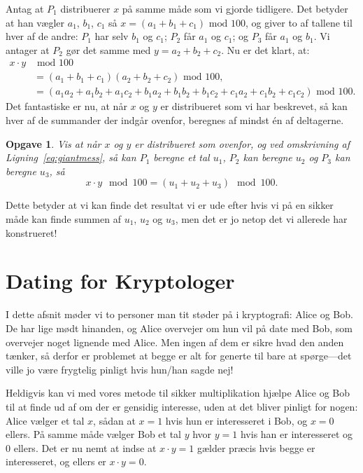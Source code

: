 \documentclass{article}
\theoremstyle{opgavedd}
\newtheorem{opgave}{Opgave}[section]
\newcommand\nsmod{\ensuremath{\text{ mod }}}
\begin{document}
Antag at $P_{1}$ distribuerer $x$ på samme måde som vi gjorde tidligere. Det betyder at
han vægler $a_{1}$, $b_{1}$, $c_{1}$ så $x=(a_{1} + b_{1} + c_{1})\nsmod{100}$, og giver
to af tallene til hver af de andre: $P_{1}$ har selv $b_{1}$ og $c_{1}$; $P_{2}$ får
$a_{1}$ og $c_{1}$; og $P_{3}$ får $a_{1}$ og $b_{1}$. Vi antager at $P_{2}$ gør det samme
med $y=a_{2} + b_{2} + c_{2}$. Nu er det klart, at:
\begin{align}
  \nonumber
  x\cdot y &\nsmod{100} \\
  \nonumber
           &= (a_{1} + b_{1} + c_{1})(a_{2} + b_{2} + c_{2}) \nsmod{100}, \\
  \label{eq:giantmess}
                       &= (a_{1}a_{2} + a_{1}b_{2} + a_{1}c_{2} + b_{1}a_{2} + b_{1}b_{2}
                         + b_{1}c_{2} + c_{1}a_{2} + c_{1}b_{2} + c_{1}c_{2}) \nsmod{100}.
\end{align}
Det fantastiske er nu, at når $x$ og $y$ er distribueret som vi har beskrevet, så kan hver
af de summander der indgår ovenfor, beregnes af mindst én af deltagerne.

\begin{opgave}
  Vis at når $x$ og $y$ er distribueret som ovenfor, og ved omskrivning af
  Ligning~\ref{eq:giantmess}, så kan $P_{1}$ beregne et tal $u_{1}$, $P_{2}$ kan beregne
  $u_{2}$ og $P_{3}$ kan beregne $u_{3}$, så
  \[
    x\cdot y \mod{100} = (u_{1} + u_{2} + u_{3}) \mod{100}.
  \]
\end{opgave}

Dette betyder at vi kan finde det resultat vi er ude efter hvis vi på en sikker måde kan
finde summen af $u_{1}$, $u_{2}$ og $u_{3}$, men det er jo netop det vi allerede har
konstrueret!

\section{Dating for Kryptologer}
I dette afsnit møder vi to personer man tit støder på i kryptografi: Alice og Bob. De har
lige mødt hinanden, og Alice overvejer om hun vil på date med Bob, som overvejer noget
lignende med Alice. Men ingen af dem er sikre hvad den anden tænker, så derfor er
problemet at begge er alt for generte til bare at spørge---det ville jo være frygtelig
pinligt hvis hun/han sagde nej!

Heldigvis kan vi med vores metode til sikker multiplikation hjælpe Alice og Bob til at
finde ud af om der er gensidig interesse, uden at det bliver pinligt for nogen: Alice
vælger et tal $x$, sådan at $x=1$ hvis hun er interesseret i Bob, og $x=0$ ellers. På
samme måde vælger Bob et tal $y$ hvor $y=1$ hvis han er interesseret og 0 ellers. Det er
nu nemt at indse at $x\cdot y=1$ gælder præcis hvis begge er interesseret, og ellers er
$x\cdot y=0$.
\end{document}
